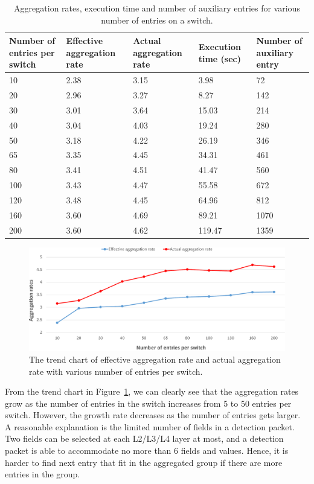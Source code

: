 \documentclass[conference]{IEEEtran}
\begin{document}
\begin{table}
\centering
\caption{Aggregation rates, execution time and number of auxiliary entries for various number of entries on a switch.}
\begin{tabular}{|p{1.8cm}|p{1cm}|p{1.3cm}|p{1.1cm}|p{1.3cm}|}
\hline Number of entries per switch & Effective aggregation rate & Actual aggregation rate & Execution time (sec) & Number of auxiliary entry \\
\hline
\hline 10 & 2.38 & 3.15 & 3.98 & 72 \\
\hline 20 & 2.96 & 3.27 & 8.27 & 142 \\
\hline 30 & 3.01 & 3.64 & 15.03 & 214 \\
\hline 40 & 3.04 & 4.03 & 19.24 & 280 \\
\hline 50 & 3.18 & 4.22 & 26.19 & 346 \\
\hline 65 & 3.35 & 4.45 & 34.31 & 461 \\
\hline 80 & 3.41 & 4.51 & 41.47 & 560 \\
\hline 100 & 3.43 & 4.47 & 55.58 & 672 \\
\hline 120 & 3.48 & 4.45 & 64.96 & 812 \\
\hline 160 & 3.60 & 4.69 & 89.21 & 1070 \\
\hline 200 & 3.60 & 4.62 & 119.47 & 1359 \\
\hline 
\end{tabular}
\label{table:different_entry_per_switch}
\end{table}

\begin{figure}[ht]
\centering
\includegraphics[width=1\linewidth]{figures/exp_entrynum_trend.pdf}
\caption{The trend chart of effective aggregation rate and actual aggregation rate with various number of entries per switch.}
\label{exp_entrynum_trend}
\end{figure}

From the trend chart in Figure~\ref{exp_entrynum_trend}, we can clearly see that the aggregation rates grow as the number of entries in the switch increases from 5 to 50 entries per switch. However, the growth rate decreases as the number of entries gets larger. A reasonable explanation is the limited number of fields in a detection packet. Two fields can be selected at each L2/L3/L4 layer at most, and a detection packet is able to accommodate no more than 6 fields and values. Hence, it is harder to find next entry that fit in the aggregated group if there are more entries in the group.
\end{document}
